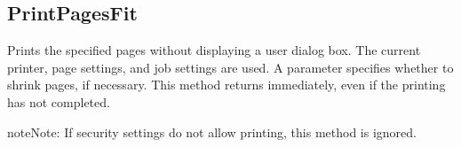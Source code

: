 \documentclass[letterpaper,12pt,english,openany,oneside]{sphinxmanual}
\begin{document}
\subsection{PrintPagesFit}
\label{\detokenize{IAC_API_OLE_Objects:printpagesfit}}
Prints the specified pages without displaying a user dialog box. The current printer, page settings, and job settings are used. A parameter specifies whether to shrink pages, if necessary. This method returns immediately, even if the printing has not completed.

\begin{sphinxadmonition}{note}{Note:}
If security settings do not allow printing, this method is ignored.
\end{sphinxadmonition}


\begin{sphinxVerbatim}[commandchars=\\\{\}]
     
                  
\end{sphinxVerbatim}
\label{\detokenize{IAC_API_OLE_Objects:parameters-83}}
\end{document}
